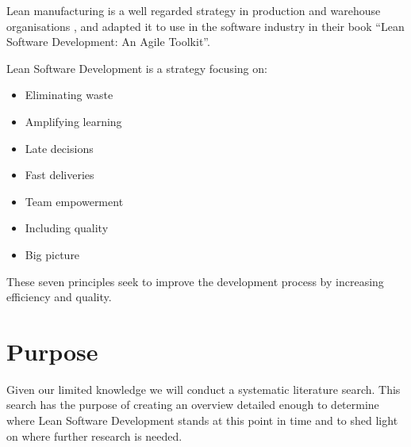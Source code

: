 Lean manufacturing is a well regarded strategy in production and warehouse organisations , and \citet{poppendieck2003} adapted it to use in the software industry in their book ``Lean Software Development: An Agile Toolkit''.

Lean Software Development is a strategy focusing on: 
\begin{itemize}
	\item Eliminating waste
	\item Amplifying learning
	\item Late decisions
	\item Fast deliveries
	\item Team empowerment
	\item Including quality
	\item Big picture
\end{itemize}

These seven principles seek to improve the development process by increasing efficiency and quality.

\section{Purpose}
Given our limited knowledge we will conduct a systematic literature search.
This search has the purpose of creating an overview detailed enough to determine where Lean Software Development stands at this point in time and to shed light on where further research is needed. 
